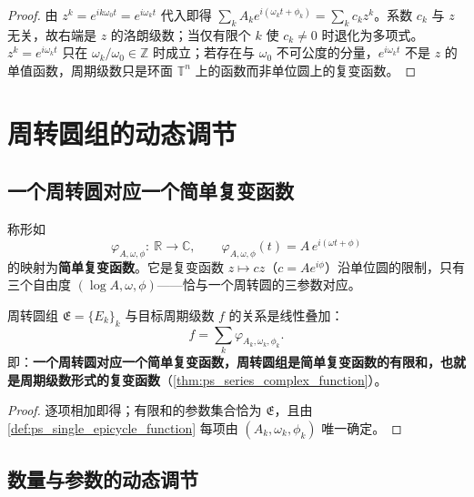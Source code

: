 \begin{proof}
由 $z^k=e^{ik\omega_0t}=e^{i\omega_kt}$ 代入即得 $\sum_kA_ke^{i(\omega_kt+\phi_k)}=\sum_kc_kz^k$。系数 $c_k$ 与 $z$ 无关，故右端是 $z$ 的洛朗级数；当仅有限个 $k$ 使 $c_k\neq0$ 时退化为多项式。$z^k=e^{i\omega_kt}$ 只在 $\omega_k/\omega_0\in\mathbb Z$ 时成立；若存在与 $\omega_0$ 不可公度的分量，$e^{i\omega_kt}$ 不是 $z$ 的单值函数，周期级数只是环面 $\mathbb{T}^n$ 上的函数而非单位圆上的复变函数。
\end{proof}

\section{周转圆组的动态调节}\label{sec:ps_adaptive}

\subsection{一个周转圆对应一个简单复变函数}

\begin{definition}\label{def:ps_single_epicycle_function}
称形如
\[
\varphi_{A,\omega,\phi}:\ \mathbb{R}\to\mathbb{C},\qquad
\varphi_{A,\omega,\phi}(t)=A\,e^{i(\omega t+\phi)}
\]
的映射为\textbf{简单复变函数}。它是复变函数 $z\mapsto cz$（$c=Ae^{i\phi}$）沿单位圆的限制，只有三个自由度 $(\log A,\omega,\phi)$——恰与一个周转圆的三参数对应。
\end{definition}

\begin{proposition}[周转圆组即周期级数形式的复变函数]\label{prop:ps_group_as_function}
周转圆组 $\mathfrak{E}=\{E_k\}_k$ 与目标周期级数 $f$ 的关系是线性叠加：
\[
f=\sum_k\varphi_{A_k,\omega_k,\phi_k}.
\]
即：\textbf{一个周转圆对应一个简单复变函数，周转圆组是简单复变函数的有限和，也就是周期级数形式的复变函数}（\cref{thm:ps_series_complex_function}）。
\end{proposition}

\begin{proof}
逐项相加即得；有限和的参数集合恰为 $\mathfrak{E}$，且由 \cref{def:ps_single_epicycle_function} 每项由 $(A_k,\omega_k,\phi_k)$ 唯一确定。
\end{proof}

\subsection{数量与参数的动态调节}

